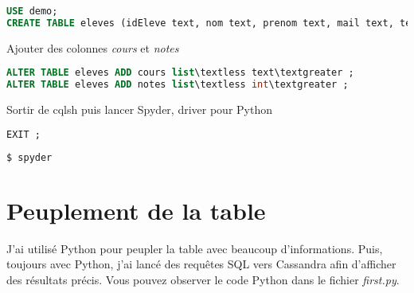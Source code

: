 \documentclass{article}
\begin{document}
\begin{enumerate}
\begin{item}
\begin{tcolorbox}
\begin{lstlisting}[language=SQL]
USE demo;
CREATE TABLE eleves (idEleve text, nom text, prenom text, mail text, telephone text, PRIMARY KEY (idEleve));
\end{lstlisting}
\end{tcolorbox}
\end{item}
\begin{item}
Ajouter des colonnes \textit{cours} et \textit{notes}
\begin{tcolorbox}
\begin{lstlisting}[language=SQL]
ALTER TABLE eleves ADD cours list\textless text\textgreater ;
ALTER TABLE eleves ADD notes list\textless int\textgreater ;
\end{lstlisting}
\end{tcolorbox}
\end{item}
\begin{item}
Sortir de cqlsh puis lancer Spyder, driver pour Python
\begin{tcolorbox}
\begin{lstlisting}[language=SQL]
EXIT ;
\end{lstlisting}
\end{tcolorbox}
\begin{tcolorbox}
\begin{lstlisting}[language=sh]
$ spyder
\end{lstlisting}
\end{tcolorbox}
\end{item}
\end{enumerate}


\section{Peuplement de la table}

J'ai utilis\'{e} Python pour peupler la table avec beaucoup d'informations. Puis, toujours avec Python, j'ai lanc\'{e} des requ\^{e}tes SQL vers Cassandra afin d'afficher des r\'{e}sultats pr\'{e}cis. Vous pouvez observer le code Python dans le fichier \textit{first.py}.
\end{document}
